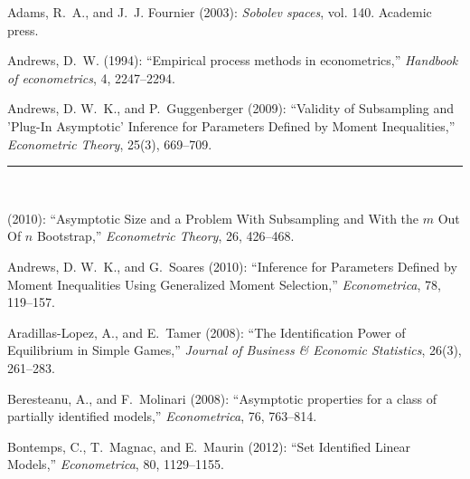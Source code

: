 \documentclass[letterpaper,11pt]{article}
\theoremstyle{myplain}
\theoremstyle{mydefinition}
\theoremstyle{myremark}
\numberwithin{equation}{section}
\numberwithin{figure}{section}
\begin{document}
\ifx\undefined\BySame
\newcommand{\BySame}{\leavevmode\rule[.5ex]{3em}{.5pt}\ }
\fi
\ifx\undefined\textsc
\newcommand{\textsc}[1]{{\sc #1}}
\newcommand{\emph}[1]{{\em #1\/}}
\let\tmpsmall\small
\renewcommand{\small}{\tmpsmall\sc}
\fi
\begin{thebibliography}{}

\textsc{Adams, R.~A.,  {\small and} J.~J. Fournier}  (2003): \emph{Sobolev
  spaces}, vol. 140. Academic press.

\textsc{Andrews, D.~W.}  (1994): ``Empirical process methods in econometrics,''
  \emph{Handbook of econometrics}, 4, 2247--2294.

\textsc{Andrews, D. W.~K.,  {\small and} P.~Guggenberger}  (2009): ``Validity
  of Subsampling and 'Plug-In Asymptotic' Inference for Parameters Defined by
  Moment Inequalities,'' \emph{Econometric Theory}, 25(3), 669--709.

\textsc{\BySame{}}  (2010): ``Asymptotic Size and a Problem With Subsampling
  and With the $m$ Out Of $n$ Bootstrap,'' \emph{Econometric Theory}, 26,
  426--468.

\textsc{Andrews, D. W.~K.,  {\small and} G.~Soares}  (2010): ``Inference for
  Parameters Defined by Moment Inequalities Using Generalized Moment
  Selection,'' \emph{Econometrica}, 78, 119--157.

\textsc{Aradillas-Lopez, A.,  {\small and} E.~Tamer}  (2008): ``The
  Identification Power of Equilibrium in Simple Games,'' \emph{Journal of
  Business \& Economic Statistics}, 26(3), 261--283.

\textsc{Beresteanu, A.,  {\small and} F.~Molinari}  (2008): ``Asymptotic
  properties for a class of partially identified models,'' \emph{Econometrica},
  76, 763--814.

\textsc{Bontemps, C., T.~Magnac,  {\small and} E.~Maurin}  (2012): ``Set
  Identified Linear Models,'' \emph{Econometrica}, 80, 1129--1155.


\end{thebibliography}
\end{document}
